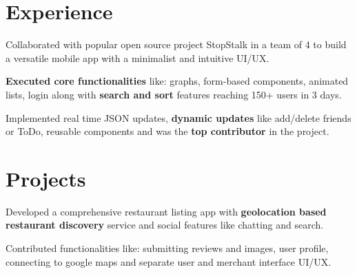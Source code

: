 \documentclass{deedy-resume-openfont}
\begin{document}
\begin{minipage}[t]{0.66\textwidth} 

\section{Experience}
\vspace{1mm}
\vspace{\topsep} %
\begin{tightemize}
{\justifying
\item Collaborated with popular open source project StopStalk in a team of 4 to build a versatile mobile app with a minimalist and intuitive UI/UX.
\item \textbf{Executed core functionalities} like: graphs, form-based components, animated lists, login along with \textbf{search and sort} features reaching 150+ users in 3 days.
\item Implemented real time JSON updates,\textbf{ dynamic updates} like add/delete friends or ToDo, reusable components and was the \textbf{top contributor} in the project.
\par}
\end{tightemize}
\sectionsep

\sectionsep
\section{Projects}
\vspace{1mm}
\begin{tightemize}
{\justifying
\item Developed a comprehensive restaurant listing app with \textbf{geolocation based restaurant discovery} service and social features like chatting and search.
\item Contributed functionalities like: submitting reviews and images, user profile, connecting to google maps and separate user and merchant interface UI/UX.
\par}
\end{tightemize}
\sectionsep


\end{minipage}
\end{document}
